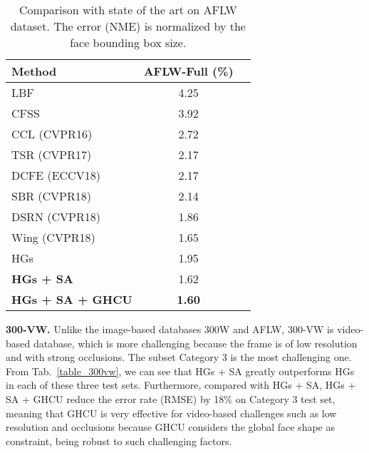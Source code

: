 \documentclass[10pt,twocolumn,letterpaper]{article}
\begin{document}
{{{			
			\begin{table}[!thp]
				\centering
\caption{Comparison with state of the art on AFLW dataset. The error (NME) is normalized by the face bounding box size.}
				\vspace{3pt}
				\footnotesize
				\label{table_aflw}
				\begin{tabular}{l|cc}
					\hline
					Method   & AFLW-Full (\%)\\
					\hline
					LBF~\cite{ren2016face} & 4.25 \\
					CFSS~\cite{zhu2015face} & 3.92 \\
					CCL (CVPR16)~\cite{zhu2016unconstrained} & 2.72 \\
					TSR (CVPR17)~\cite{lv2017deep} & 2.17 \\
					DCFE (ECCV18)~\cite{valle2018deeply} & 2.17 \\
					SBR (CVPR18)~\cite{dong2018supervision} & 2.14 \\
					DSRN (CVPR18)~\cite{miao2018direct} & 1.86 \\
					Wing (CVPR18)~\cite{feng2017wing} & 1.65 \\
					\hline
					HGs & 1.95 \\
					\textbf{HGs + SA} & 1.62 \\
					\textbf{HGs + SA + GHCU} & \textbf{1.60} \\
					\hline
\end{tabular}
			\end{table}
			
			
			
			\textbf{300-VW.} 
			Unlike the image-based databases 300W and AFLW, 300-VW is video-based database, which is more challenging because the frame is of low resolution and with strong occlusions. The subset Category 3 is the most challenging one. From Tab.~\ref{table_300vw}, 
			{we can see that HGs + SA greatly outperforms HGs in each of these three test sets. Furthermore, }
			compared with HGs + SA, HGs + SA + GHCU reduce the error rate (RMSE) by 18\% {on Category 3 test set}, meaning that GHCU is very effective for video-based challenges such as low resolution and occlusions because GHCU 
			considers
			the global face shape as constraint, being robust to such challenging factors.
			


}}}
\end{document}
